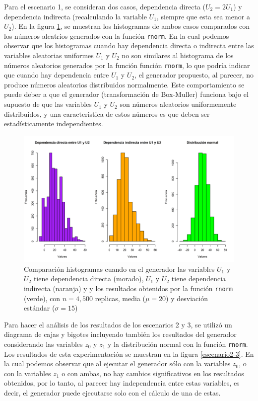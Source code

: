 \documentclass{article}
\begin{document}
Para el escenario 1, se consideran dos casos, dependencia directa ($U_{2} = 2U_{1}$) y dependencia indirecta (recalculando la variable $U_{1}$, siempre que esta sea menor a $U_{2}$). En la figura \ref{escenario1}, se muestran los histogramas de ambos casos comparados con los números aleatrios generados con la función \texttt{rnorm}. En la cual podemos observar que los histogramas cuando hay dependencia directa o indirecta entre las variables aleatorias uniformes $U_{1}$ y $U_{2}$ no son similares al histograma de los números aleatorios generados por la función función \texttt{rnorm}, lo que podría indicar que cuando hay dependencia entre $U_{1}$ y $U_{2}$, el generador propuesto, al parecer, no produce números aleatorios distribuidos normalmente. Este comportamiento se puede deber a que el generador (transformación de Box-Muller) funciona bajo el supuesto de que las variables $U_{1}$ y $U_{2}$ son números aleatorios uniformemente distribuidos, y una caracteristica de estos números es que deben ser estadísticamente independientes.

\begin{figure}
\centering
\includegraphics[width=\linewidth]{Figures/comparativosU.png}
\caption{Comparación histogramas cuando en el generador las variables $U_{1}$ y $U_{2}$ tiene dependencia directa (morado), $U_{1}$ y $U_{2}$ tiene dependencia indirecta (naranja) y y los resultados obtenidos por la función \texttt{rnorm} (verde), con $n= 4,500$ replicas, media ($\mu = 20$) y desviación estándar ($\sigma = 15$)}
\label{escenario1}
\end{figure}


Para hacer el análisis de los resultados de los escenarios 2 y 3, se utilizó un diagrama de cajas y bigotes incluyendo también los resultados del generador considerando las variables $z_{0}$ y $z_{1}$ y la distribución normal con la función \texttt{rnorm}. Los resultados de esta experimentación se muestran en la figura \ref{escenario2-3}. En la cual podemos observar que al ejecutar el generador sólo con la variables $z_{0}$, o con la variables $z_{1}$ o con ambas, no hay cambios significativos en los resultados obtenidos, por lo tanto, al parecer hay independencia entre estas variables, es decir, el generador puede ejecutarse solo con el cálculo de una de estas.
\end{document}

